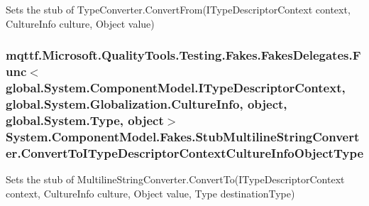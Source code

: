 Sets the stub of Type\-Converter.\-Convert\-From(\-I\-Type\-Descriptor\-Context context, Culture\-Info culture, Object value)

\hypertarget{class_system_1_1_component_model_1_1_fakes_1_1_stub_multiline_string_converter_a7e57879cf08de9791463194ce48db63a}{
\subsubsection[{Convert\-To\-I\-Type\-Descriptor\-Context\-Culture\-Info\-Object\-Type}]{\setlength{\rightskip}{0pt plus 5cm}mqttf.\-Microsoft.\-Quality\-Tools.\-Testing.\-Fakes.\-Fakes\-Delegates.\-Func$<$global.\-System.\-Component\-Model.\-I\-Type\-Descriptor\-Context, global.\-System.\-Globalization.\-Culture\-Info, object, global.\-System.\-Type, object$>$ System.\-Component\-Model.\-Fakes.\-Stub\-Multiline\-String\-Converter.\-Convert\-To\-I\-Type\-Descriptor\-Context\-Culture\-Info\-Object\-Type}}\label{class_system_1_1_component_model_1_1_fakes_1_1_stub_multiline_string_converter_a7e57879cf08de9791463194ce48db63a}


Sets the stub of Multiline\-String\-Converter.\-Convert\-To(\-I\-Type\-Descriptor\-Context context, Culture\-Info culture, Object value, Type destination\-Type)

